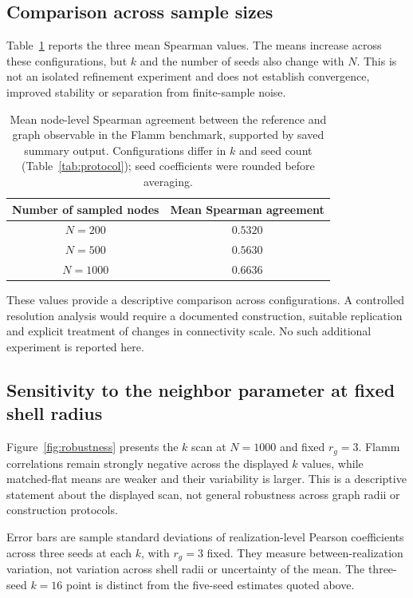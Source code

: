 \documentclass[11pt,a4paper]{article}
\begin{document}
\subsection{Comparison across sample sizes}
Table~\ref{tab:refinement} reports the three mean Spearman values. The means increase across these configurations, but $k$ and the number of seeds also change with $N$. This is not an isolated refinement experiment and does not establish convergence, improved stability or separation from finite-sample noise.
\begin{table}[!htbp]
\centering
\caption{Mean node-level Spearman agreement between the reference and graph observable in the Flamm benchmark, supported by saved summary output. Configurations differ in $k$ and seed count (Table~\ref{tab:protocol}); seed coefficients were rounded before averaging.}
\label{tab:refinement}
\begin{tabular}{cc}
\toprule
Number of sampled nodes & Mean Spearman agreement \\
\midrule
$N=200$ & $0.5320$ \\
$N=500$ & $0.5630$ \\
$N=1000$ & $0.6636$ \\
\bottomrule
\end{tabular}
\end{table}
\FloatBarrier
These values provide a descriptive comparison across configurations. A controlled resolution analysis would require a documented construction, suitable replication and explicit treatment of changes in connectivity scale. No such additional experiment is reported here.

\subsection{Sensitivity to the neighbor parameter at fixed shell radius}
Figure~\ref{fig:robustness} presents the $k$ scan at $N=1000$ and fixed $r_g=3$. Flamm correlations remain strongly negative across the displayed $k$ values, while matched-flat means are weaker and their variability is larger. This is a descriptive statement about the displayed scan, not general robustness across graph radii or construction protocols.

Error bars are sample standard deviations of realization-level Pearson coefficients across three seeds at each $k$, with $r_g=3$ fixed. They measure between-realization variation, not variation across shell radii or uncertainty of the mean. The three-seed $k=16$ point is distinct from the five-seed estimates quoted above.
\end{document}
